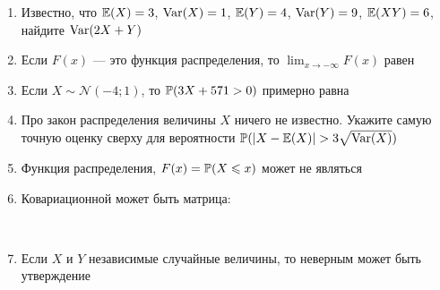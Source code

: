\documentclass[12pt, a4paper]{article}\usepackage[]{graphicx}\usepackage[]{color}
\newcommand{\cN}{\mathcal{N}}
\begin{document}
\begin{enumerate}

\item Известно, что $\E(X)=3$, $\Var(X)=1$, $\E(Y)=4$, $\Var(Y)=9$, $\E(XY)=6$, найдите $\Var(2X+Y)$


\item Если $F(x)$ — это функция распределения, то $\lim_{x\to -\infty}F(x)$ равен


\item Если $X\sim \cN(-4;1)$, то $\P(3X+571>0)$ примерно равна


\item Про закон распределения величины $X$ ничего не известно. Укажите самую точную оценку сверху для вероятности $\P(|X-\E(X)|>3\sqrt{\Var(X)})$


\item Функция распределения, $F(x)=\P(X\leq x)$ может не являться


\item Ковариационной может быть матрица:

\\

\item Если $X$ и $Y$ независимые случайные величины, то неверным может быть утверждение


\end{enumerate}
\end{document}
